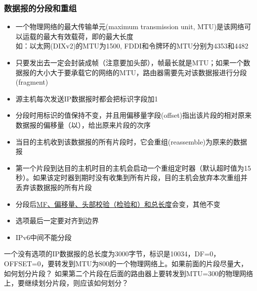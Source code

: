 \subsubsection{数据报的分段和重组}
\begin{itemize}
\item 一个物理网络的最大传输单元(maximum transmission unit, MTU)是该网络可以运载的最大有效载荷，即的最大长度\\
如：以太网(DIXv2)的MTU为1500, FDDI和令牌环的MTU分别为4353和4482
\item 只要发出去一定会封装成帧（注意要加头部），帧最长就是MTU；如果一个数据报的大小大于要承载它的网络的MTU，路由器需要先对该数据报进行分段(fragment)
\item 源主机每次发送IP数据报时都会把标识字段加1
\item 分段时用标识的值保持不变，并且用偏移量字段(offset)指出该片段的相对原来数据报的偏移量（以），给出原来片段的次序
\item 当目的主机收到该数据报的所有片段时，它会重组(reassemble)为原来的数据报
\item 第一个片段到达目的主机时目的主机会启动一个重组定时器（默认超时值为15秒）。如果该定时器到期时没有收集到所有片段，目的主机会放弃本次重组并丢弃该数据报的所有片段
\item 分段后\underline{MF、偏移量、头部校验（检验和）和总长度}会变，其他不变
\item 选项最后一定要对齐到边界
\item IPv6中间不能分段
\end{itemize}
\begin{example}
	一个没有选项的IP数据报的总长度为3000字节，标识是10034，DF=0，OFFSET=0，要转发到MTU为800的一个物理网络上。如果前面的片段尽量大，如何划分片段？
	如果第二个片段在后面的路由器上要转发到MTU=300的物理网络上，要继续划分片段，则应该如何划分？
\end{example}
